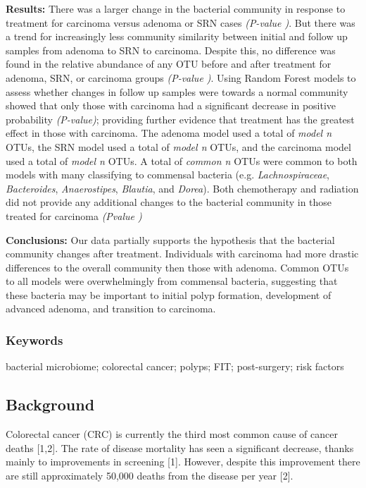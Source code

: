 \documentclass[12pt,]{article}
\begin{document}
\textbf{Results:} There was a larger change in the bacterial community
in response to treatment for carcinoma versus adenoma or SRN cases
\emph{(P-value )}. But there was a trend for increasingly less community
similarity between initial and follow up samples from adenoma to SRN to
carcinoma. Despite this, no difference was found in the relative
abundance of any OTU before and after treatment for adenoma, SRN, or
carcinoma groups \emph{(P-value )}. Using Random Forest models to assess
whether changes in follow up samples were towards a normal community
showed that only those with carcinoma had a significant decrease in
positive probability \emph{(P-value)}; providing further evidence that
treatment has the greatest effect in those with carcinoma. The adenoma
model used a total of \emph{model n} OTUs, the SRN model used a total of
\emph{model n} OTUs, and the carcinoma model used a total of \emph{model
n} OTUs. A total of \emph{common n} OTUs were common to both models with
many classifying to commensal bacteria (e.g. \emph{Lachnospiraceae},
\emph{Bacteroides}, \emph{Anaerostipes}, \emph{Blautia}, and
\emph{Dorea}). Both chemotherapy and radiation did not provide any
additional changes to the bacterial community in those treated for
carcinoma \emph{(Pvalue )}

\textbf{Conclusions:} Our data partially supports the hypothesis that
the bacterial community changes after treatment. Individuals with
carcinoma had more drastic differences to the overall community then
those with adenoma. Common OTUs to all models were overwhelmingly from
commensal bacteria, suggesting that these bacteria may be important to
initial polyp formation, development of advanced adenoma, and transition
to carcinoma.

\newpage

\subsubsection{Keywords}\label{keywords}

bacterial microbiome; colorectal cancer; polyps; FIT; post-surgery; risk
factors

\newpage

\subsection{Background}\label{background}

Colorectal cancer (CRC) is currently the third most common cause of
cancer deaths {[}1,2{]}. The rate of disease mortality has seen a
significant decrease, thanks mainly to improvements in screening
{[}1{]}. However, despite this improvement there are still approximately
50,000 deaths from the disease per year {[}2{]}.
\end{document}
